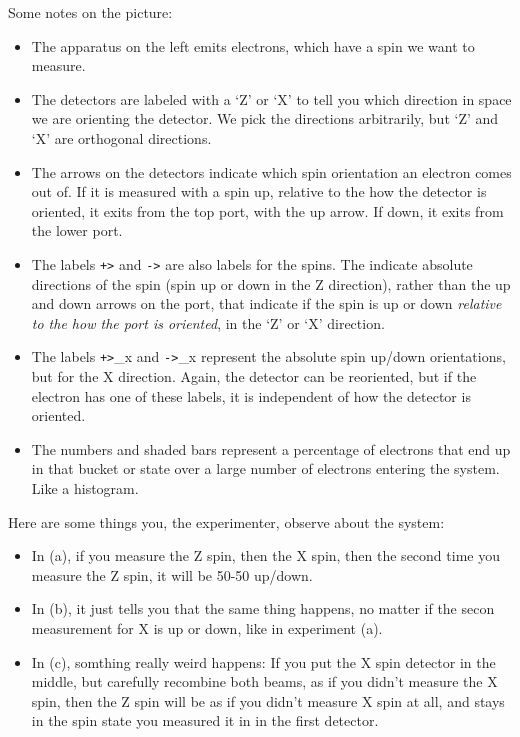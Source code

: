 \documentclass[
]{book}
\providecommand{\tightlist}{%
  \setlength{\itemsep}{0pt}\setlength{\parskip}{0pt}}
\begin{document}
Some notes on the picture:

\begin{itemize}
\tightlist
\item
  The apparatus on the left emits electrons, which have a spin we want to measure.
\item
  The detectors are labeled with a `Z' or `X' to tell you which direction in space we are orienting the detector. We pick the directions arbitrarily, but `Z' and `X' are orthogonal directions.
\item
  The arrows on the detectors indicate which spin orientation an electron comes out of. If it is measured with a spin up, relative to the how the detector is oriented, it exits from the top port, with the up arrow. If down, it exits from the lower port.
\item
  The labels \texttt{\textbar{}+\textgreater{}} and \texttt{\textbar{}-\textgreater{}} are also labels for the spins. The indicate absolute directions of the spin (spin up or down in the Z direction), rather than the up and down arrows on the port, that indicate if the spin is up or down \emph{relative to the how the port is oriented}, in the `Z' or `X' direction.
\item
  The labels \texttt{\textbar{}+\textgreater{}}\_x and \texttt{\textbar{}-\textgreater{}}\_x represent the absolute spin up/down orientations, but for the X direction. Again, the detector can be reoriented, but if the electron has one of these labels, it is independent of how the detector is oriented.
\item
  The numbers and shaded bars represent a percentage of electrons that end up in that bucket or state over a large number of electrons entering the system. Like a histogram.
\end{itemize}

Here are some things you, the experimenter, observe about the system:

\begin{itemize}
\tightlist
\item
  In (a), if you measure the Z spin, then the X spin, then the second time you measure the Z spin, it will be 50-50 up/down.
\item
  In (b), it just tells you that the same thing happens, no matter if the secon measurement for X is up or down, like in experiment (a).
\item
  In (c), somthing really weird happens: If you put the X spin detector in the middle, but carefully recombine both beams, as if you didn't measure the X spin, then the Z spin will be as if you didn't measure X spin at all, and stays in the spin state you measured it in in the first detector.
\end{itemize}
\end{document}
